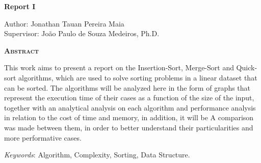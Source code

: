 \begin{center}
	{\Large{\textbf{Report I}}}
\end{center}

\vspace{1cm}

\begin{flushright}
	Author: Jonathan Tauan Pereira Maia\\
	Supervisor: João Paulo de Souza Medeiros, Ph.D.
\end{flushright}

\vspace{1cm}

\begin{center}
	\Large{\textsc{\textbf{Abstract}}}
\end{center}

\noindent  This work aims to present a report on the Insertion-Sort, Merge-Sort and Quick-sort algorithms, which are used to solve sorting problems in a linear dataset that can be sorted. The algorithms will be analyzed here in the form of graphs that represent the execution time of their cases as a function of the size of the input, together with an analytical analysis on each algorithm and performance analysis in relation to the cost of time and memory, in addition, it will be A comparison was made between them, in order to better understand their particularities and more performative cases.

\noindent\textit{Keywords}: Algorithm, Complexity, Sorting, Data Structure.
